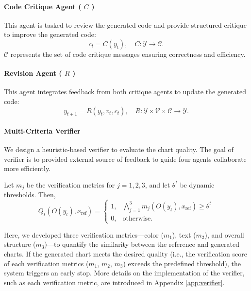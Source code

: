 \paragraph{\textbf{Code Critique Agent ( \(C\) )}}  
This agent is tasked to review the generated code and provide structured critique to improve the generated code:
\[
    c_t = C(y_t), \quad C: \mathcal{Y} \to \mathcal{C}.
\]
\(\mathcal{C}\) represents the set of code critique messages ensuring correctness and efficiency.

\paragraph{\textbf{Revision Agent ( \(R\) )}}  
This agent integrates feedback from both critique agents to update the generated code:
\[
    y_{t+1} = R(y_t, v_t, c_t), \quad R: \mathcal{Y} \times \mathcal{V} \times \mathcal{C} \to \mathcal{Y}.
\]


\paragraph{\textbf{Multi-Criteria Verifier}} 
We design a heuristic-based verifier to evaluate the chart quality. The goal of verifier is to provided external source of feedback to guide four agents collaborate more efficiently.

Let \(m_j\) be the verification metrics for \(j=1,2,3\), and let \(\theta^t\) be dynamic thresholds. Then,
\[
    Q_t(O(y_t), x_{\text{ref}}) = 
    \begin{cases}
        1, & \bigwedge_{j=1}^3 m_j(O(y_t), x_{\text{ref}}) \geq \theta^t \\
        0, & \text{otherwise}.
    \end{cases}
\]

Here, we developed three verification metrics—color (\(m_1\)), text (\(m_2\)), and overall structure (\(m_3\))—to quantify the similarity between the reference and generated charts. If the generated chart meets the desired quality (i.e., the verification score of each verification metrics (\(m_1\), \(m_2\), \(m_3\)) exceeds the predefined threshold), the system triggers an early stop. More details on the implementation of the verifier, such as each verification metric, are introduced in Appendix \ref{app:verifier}.


